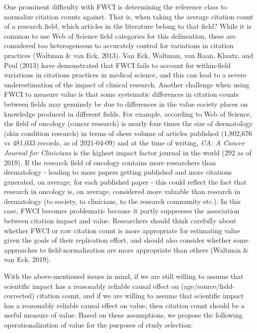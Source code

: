 \documentclass[
  english,
  jou,floatsintext]{apa6}
\begin{document}
One prominent difficulty with FWCI is determining the reference class to normalize citation counts against. That is, when taking the average citation count of a research field, which articles in the literature belong to that field? While it is common to use Web of Science field categories for this delineation, these are considered too heterogeneous to accurately control for variations in citation practices (Waltman \& van Eck, 2013). Van Eck, Waltman, van Raan, Klautz, and Peul (2013) have demonstrated that FWCI fails to account for within-field variations in citations practices in medical science, and this can lead to a severe underestimation of the impact of clinical research. Another challenge when using FWCI to measure value is that some systematic differences in citation counts between fields may genuinely be due to differences in the value society places on knowledge produced in different fields. For example, according to Web of Science, the field of oncology (cancer research) is nearly four times the size of dermatology (skin condition research) in terms of sheer volume of articles published (1,802,676 vs 481,033 records, as of 2021-04-09) and at the time of writing, \emph{CA: A Cancer Journal for Clinicians} is the highest impact factor journal in the world (292 as of 2019). If the research field of oncology contains more researchers than dermatology - leading to more papers getting published and more citations generated, on average, for each published paper - this could reflect the fact that research in oncology is, on average, considered more valuable than research in dermatology (to society, to clinicians, to the research community etc.). In this case, FWCI becomes problematic because it partly suppresses the association between citation impact and value. Researchers should think carefully about whether FWCI or raw citation count is more appropriate for estimating value given the goals of their replication effort, and should also consider whether some approaches to field-normalization are more appropriate than others (Waltman \& van Eck, 2019).

With the above-mentioned issues in mind, if we are still willing to assume that scientific impact has a reasonably reliable causal effect on (age/source/field-corrected) citation count, and if we are willing to assume that scientific impact has a reasonably reliable causal effect on value, then citation count should be a useful measure of value. Based on these assumptions, we propose the following operationalization of value for the purposes of study selection:
\end{document}
